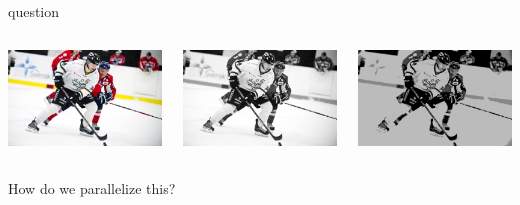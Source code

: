 \begin{frame}{question}

  \begin{columns}
    \begin{column}{0.3\linewidth}
      \includegraphics[width=0.8\linewidth]{hockey.png}
    \end{column}
    \pause
    \begin{column}{0.3\linewidth}
      \includegraphics[width=0.8\linewidth]{gray.png}
    \end{column}
    \pause
    \begin{column}{0.3\linewidth}
      \includegraphics[width=0.8\linewidth]{reduced.png}
    \end{column}
\end{columns}

\pause\vspace{20pt}How do we parallelize this?

\end{frame}

